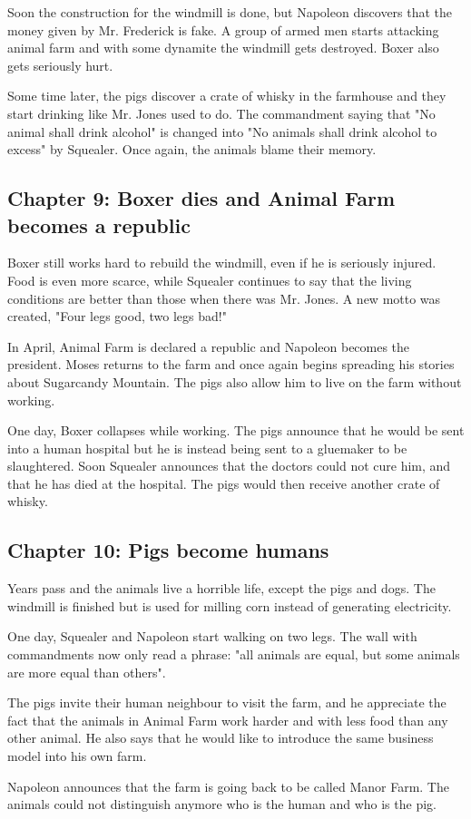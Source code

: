 \documentclass{article}
\begin{document}
    Soon the construction for the windmill is done, but Napoleon discovers that the money given by Mr. Frederick is fake. A group of armed men starts attacking animal farm and with some dynamite the windmill gets destroyed. Boxer also gets seriously hurt.

    Some time later, the pigs discover a crate of whisky in the farmhouse and they start drinking like Mr. Jones used to do. The commandment saying that "No animal shall drink alcohol" is changed into "No animals shall drink alcohol to excess" by Squealer. Once again, the animals blame their memory.

    \subsection{Chapter 9: Boxer dies and Animal Farm becomes a republic}
    Boxer still works hard to rebuild the windmill, even if he is seriously injured. Food is even more scarce, while Squealer continues to say that the living conditions are better than those when there was Mr. Jones. A new motto was created, "Four legs good, two legs bad!"

    In April, Animal Farm is declared a republic and Napoleon becomes the president. Moses returns to the farm and once again begins spreading his stories about Sugarcandy Mountain. The pigs also allow him to live on the farm without working.

    One day, Boxer collapses while working. The pigs announce that he would be sent into a human hospital but he is instead being sent to a gluemaker to be slaughtered. Soon Squealer announces that the doctors could not cure him, and that he has died at the hospital. The pigs would then receive another crate of whisky.

    \subsection{Chapter 10: Pigs become humans}
    Years pass and the animals live a horrible life, except the pigs and dogs. The windmill is finished but is used for milling corn instead of generating electricity.

    One day, Squealer and Napoleon start walking on two legs. The wall with commandments now only read a phrase: "all animals are equal, but some animals are more equal than others".

    The pigs invite their human neighbour to visit the farm, and he appreciate the fact that the animals in Animal Farm work harder and with less food than any other animal. He also says that he would like to introduce the same business model into his own farm.

    Napoleon announces that the farm is going back to be called Manor Farm. The animals could not distinguish anymore who is the human and who is the pig.
\end{document}
